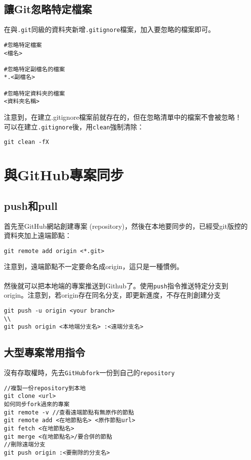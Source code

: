 \documentclass{article}
\newcommand{\code}[1]{\texttt{#1}}
\begin{document}
\subsection{讓Git忽略特定檔案}
在與\code{.git}同級的資料夾新增\code{.gitignore}檔案，加入要忽略的檔案即可。
\begin{lstlisting}[language=git]
#忽略特定檔案
<檔名>

#忽略特定副檔名的檔案
*.<副檔名>

#忽略特定資料夾的檔案
<資料夾名稱>
\end{lstlisting}
注意到，在建立.gitignore檔案前就存在的，但在忽略清單中的檔案不會被忽略！可以在建立\code{.gitignore}後，用\code{clean}強制清除：
\begin{lstlisting}[language=git]
git clean -fX
\end{lstlisting}

\section{與GitHub專案同步}
\subsection{push和pull}
首先至GitHub網站創建專案 (repository)，然後在本地要同步的，已經受git版控的資料夾加上遠端節點：
\begin{lstlisting}[language=git]
git remote add origin <*.git>
\end{lstlisting}
注意到，遠端節點不一定要命名成origin，這只是一種慣例。
\\\\
然後就可以把本地端的專案推送到Github了。使用\texttt{push}指令推送特定分支到origin。注意到，若origin存在同名分支，即更新進度，不存在則創建分支
\begin{lstlisting}[language=git]
git push -u origin <your branch>
\\
git push origin <本地端分支名> :<遠端分支名>
\end{lstlisting}
\subsection{大型專案常用指令}
沒有存取權時，先去\code{GitHub}\code{fork}一份到自己的\code{repository}
\begin{lstlisting}[language=git]
//複製一份repository到本地
git clone <url>
如何同步fork過來的專案
git remote -v //查看遠端節點有無原作的節點
git remote add <在地節點名> <原作節點url>
git fetch <在地節點名>
git merge <在地節點名>/要合併的節點
//刪除遠端分支
git push origin :<要刪除的分支名>
\end{lstlisting}
\end{document}
